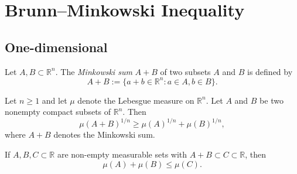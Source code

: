 %

\chapter{Brunn--Minkowski Inequality}

\section{One-dimensional}

\begin{definition}
    Let \(A, B \subset \mathbb{R}^n\). The \textit{Minkowski sum} \(A+B\) of two subsets \(A\) and \(B\) is defined by
    \begin{equation*}
        A+B:= \{a+b\in\mathbb{R}^n : a \in A, b \in B\}.
    \end{equation*}
\end{definition}

\begin{theorem}
    Let \(n \geq 1\) and let \(\mu\) denote the Lebesgue measure on \(\mathbb{R}^n\). Let \(A\) and \(B\) be two nonempty compact subsets of \(\mathbb{R}^n\). Then
    \begin{equation*}
        \mu(A+B)^{1/n} \geq \mu(A)^{1/n} + \mu(B)^{1/n},
    \end{equation*}
    where \(A+B\) denotes the Minkowski sum.
\end{theorem}

\begin{lemma}
    If \(A, B, C \subset \mathbb{R}\) are non-empty measurable sets with \(A+B\subset C \subset \mathbb{R}\), then
    \begin{equation*}
        \mu(A) + \mu(B) \leq \mu(C).
    \end{equation*}
\end{lemma}

